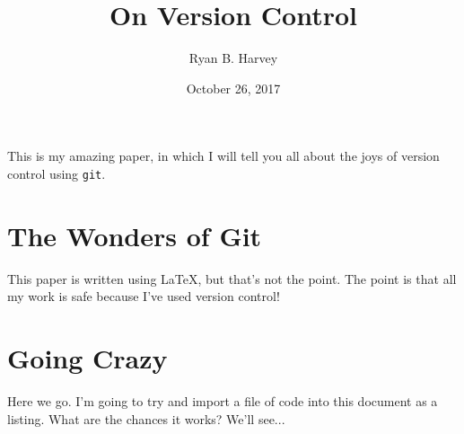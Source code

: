 \documentclass{article}      %
\title{On Version Control}   %
\author{Ryan B. Harvey}      %
\date{October 26, 2017}      %
\def\code#1{\texttt{#1}}
\begin{document}

\maketitle                   %

This is my amazing paper, in which I will tell you all about the joys
of version control using \code{git}.

\section{The Wonders of Git} %

This paper is written using
\LaTeX,    %
but that's not the point. The point is that all my
work is safe because I've used version control!

\section{Going Crazy}
Here we go. I'm going to try and import a file of code
into this document as a listing. What are the chances it
works? We'll see...
\end{document}
